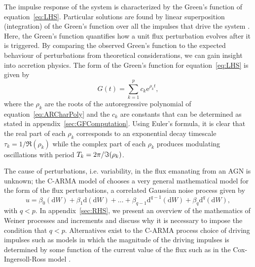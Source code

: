 \documentclass[a4paper,fleqn,usenatbib]{mnras}
\begin{document}
The impulse response of the system is characterized by the Green's function of equation~\eqref{eq:LHS}. Particular solutions are found by linear superposition (integration) of the Green's function over all the impulses that drive the system \citep{PanditWu}. Here, the Green's function quantifies how a unit flux perturbation evolves after it is triggered. By comparing the observed Green's function to the expected behaviour of perturbations from theoretical considerations, we can gain insight into accretion physics. The form of the Green's function for equation~\eqref{eq:LHS} is given by
\begin{equation}\label{eq:GFSol}
G(t) = \sum_{k = 1}^{p} c_{k} \mathrm{e}^{\rho_{k}t},
\end{equation}
where the $\rho_{k}$ are the roots of the autoregressive polynomial of equation~\eqref{eq:ARCharPoly} and the $c_{k}$ are constants that can be determined as stated in appendix~\ref{sec:GFComputation}. Using Euler's formula, it is clear that the real part of each $\rho_{k}$ corresponds to an exponential decay timescale $\tau_{k} = 1/\Re(\rho_{k})$ while the complex part of each $\rho_{k}$ produces modulating oscillations with period $T_{k} = 2\pi/\Im(\rho_{k})$.

The cause of perturbations, i.e. variability, in the flux emanating from an AGN is unknown; the C-ARMA model of \citep{Kelly14} chooses a very general mathematical model for the form of the flux perturbations, %
a correlated Gaussian noise process given by
\begin{equation}\label{eq:RHS}
u = \beta_{0} (\mathrm{d}W) + \beta_{1} \mathrm{d}(\mathrm{d}W) + \ldots + \beta_{q-1} \mathrm{d}^{q-1}(\mathrm{d}W) + \beta_{q} \mathrm{d}^{q}(\mathrm{d}W),
\end{equation}
with $q < p$. In appendix~\ref{sec:RHS}, we present an overview of the mathematics of Weiner processes and increments and discuss why it is necessary to impose the condition that $q < p$. Alternatives exist to the C-ARMA process choice of driving impulses such as models in which the magnitude of the driving impulses is determined by some function of the current value of the flux such as in the Cox-Ingersoll-Ross model \citep{CoxIngersollRoss85}.
\end{document}
